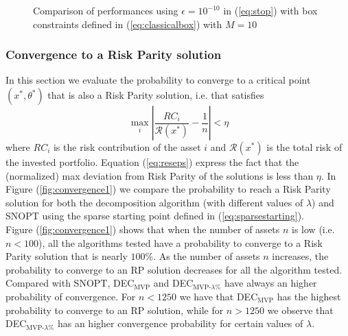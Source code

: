 \begin{figure}
{{
}
}
\caption{Comparison of performances using $\epsilon = 10^{-10}$ in (\ref{eq:stop}) with box constraints defined in (\ref{eq:classicalbox}) with $M=10$}
\label{fig:10}
\end{figure}

\subsubsection{Convergence to a Risk Parity solution}
In this section we evaluate the probability to converge to a critical point $(x^*,\theta^*)$ that is also a Risk Parity solution, i.e. that satisfies 
\begin{equation}\label{eq:reseps}
\max_i \left| \frac{RC_i}{\mathcal{R}(x^*)} - \frac{1}{n} \right| < \eta
\end{equation}
where $RC_i$ is the risk contribution of the asset $i$ and ${\mathcal{R}(x^*)}$ is the total risk of the invested portfolio. Equation (\ref{eq:reseps}) express the fact that the (normalized) max deviation from Risk Parity of the solutions is less than $\eta$. In Figure (\ref{fig:convergence1}) we compare the probability to reach a Risk Parity solution for both the decomposition algorithm (with different values of $\lambda$) and SNOPT using the sparse starting point defined in (\ref{eq:sparsestarting}).\\ Figure (\ref{fig:convergence1}) shows that when the number of assets $n$ is low (i.e. $n < 100$), all the algorithms tested have a probability to converge to a Risk Parity solution that is nearly $100\%$. As the number of assets $n$ increases, the probability to converge to an RP solution decreases for all the algorithm tested. Compared with SNOPT, DEC$_\text{MVP}$ and DEC$_{\text{MVP-}\lambda\%}$ have always an higher probability of convergence. For $n <1250$ we have that DEC$_\text{MVP}$ has the highest probability to converge to an RP solution, while for $n >1250$ we observe that DEC$_{\text{MVP-}\lambda\%}$ has an higher convergence probability for certain values of $\lambda$.

